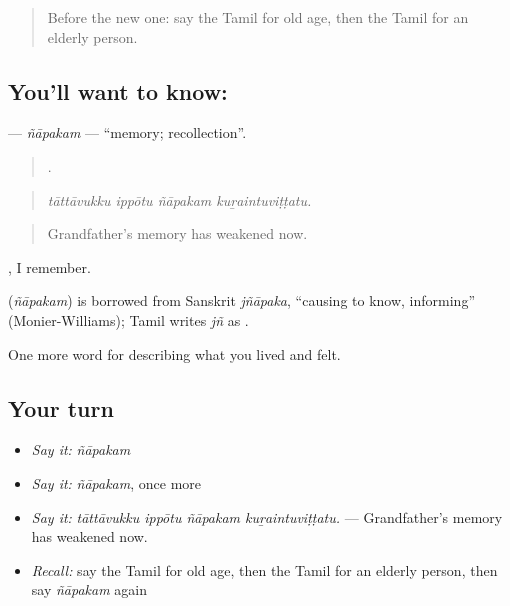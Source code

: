 \label{lesson:TA-C504-napakam}



\begin{quote}
Before the new one: say the Tamil for old age, then the Tamil for an elderly person.
\end{quote}

\subsection*{You'll want to know: }
\textbf{} — \emph{ñāpakam} — \textquotedblleft{}memory; recollection\textquotedblright{}.

\begin{quote}
   .
\end{quote}

\begin{quote}
\emph{tāttāvukku ippōtu ñāpakam kuṟaintuviṭṭatu.}
\end{quote}

\begin{quote}
Grandfather’s memory has weakened now.
\end{quote}

 , I remember.

\begin{cousinweb}
\textbf{} (\emph{ñāpakam}) is borrowed from Sanskrit \emph{jñāpaka}, \textquotedblleft{}causing to know, informing\textquotedblright{} (Monier-Williams); Tamil writes \emph{jñ} as .
\end{cousinweb}

\begin{grammarlens}[title={What you've built}]
One more word for describing what you lived and felt.
\end{grammarlens}

\subsection*{Your turn}
\begin{itemize}
\raggedright
  \item \emph{Say it:} \emph{ñāpakam}
  \item \emph{Say it:} \emph{ñāpakam}, once more
  \item \emph{Say it:} \emph{tāttāvukku ippōtu ñāpakam kuṟaintuviṭṭatu.} — Grandfather’s memory has weakened now.
  \item \emph{Recall:} say the Tamil for old age, then the Tamil for an elderly person, then say \emph{ñāpakam} again
\end{itemize}

